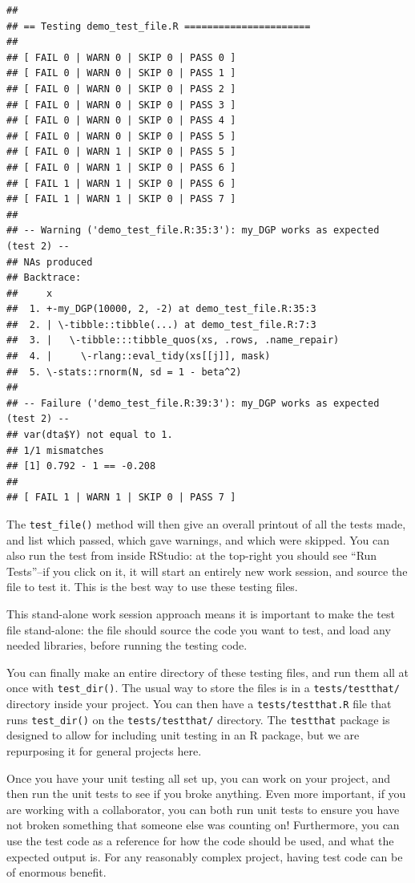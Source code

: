 \documentclass[
]{book}
\begin{document}
\begin{verbatim}
## 
## == Testing demo_test_file.R ======================
## 
## [ FAIL 0 | WARN 0 | SKIP 0 | PASS 0 ]
## [ FAIL 0 | WARN 0 | SKIP 0 | PASS 1 ]
## [ FAIL 0 | WARN 0 | SKIP 0 | PASS 2 ]
## [ FAIL 0 | WARN 0 | SKIP 0 | PASS 3 ]
## [ FAIL 0 | WARN 0 | SKIP 0 | PASS 4 ]
## [ FAIL 0 | WARN 0 | SKIP 0 | PASS 5 ]
## [ FAIL 0 | WARN 1 | SKIP 0 | PASS 5 ]
## [ FAIL 0 | WARN 1 | SKIP 0 | PASS 6 ]
## [ FAIL 1 | WARN 1 | SKIP 0 | PASS 6 ]
## [ FAIL 1 | WARN 1 | SKIP 0 | PASS 7 ]
## 
## -- Warning ('demo_test_file.R:35:3'): my_DGP works as expected (test 2) --
## NAs produced
## Backtrace:
##     x
##  1. +-my_DGP(10000, 2, -2) at demo_test_file.R:35:3
##  2. | \-tibble::tibble(...) at demo_test_file.R:7:3
##  3. |   \-tibble:::tibble_quos(xs, .rows, .name_repair)
##  4. |     \-rlang::eval_tidy(xs[[j]], mask)
##  5. \-stats::rnorm(N, sd = 1 - beta^2)
## 
## -- Failure ('demo_test_file.R:39:3'): my_DGP works as expected (test 2) --
## var(dta$Y) not equal to 1.
## 1/1 mismatches
## [1] 0.792 - 1 == -0.208
## 
## [ FAIL 1 | WARN 1 | SKIP 0 | PASS 7 ]
\end{verbatim}

The \texttt{test\_file()} method will then give an overall printout of all the tests made, and list which passed, which gave warnings, and which were skipped.
You can also run the test from inside RStudio: at the top-right you should see ``Run Tests''--if you click on it, it will start an entirely new work session, and source the file to test it.
This is the best way to use these testing files.

This stand-alone work session approach means it is important to make the test file stand-alone: the file should source the code you want to test, and load any needed libraries, before running the testing code.

You can finally make an entire directory of these testing files, and run them all at once with \texttt{test\_dir()}.
The usual way to store the files is in a \texttt{tests/testthat/} directory inside your project.
You can then have a \texttt{tests/testthat.R} file that runs \texttt{test\_dir()} on the \texttt{tests/testthat/} directory.
The \texttt{testthat} package is designed to allow for including unit testing in an R package, but we are repurposing it for general projects here.

Once you have your unit testing all set up, you can work on your project, and then run the unit tests to see if you broke anything.
Even more important, if you are working with a collaborator, you can both run unit tests to ensure you have not broken something that someone else was counting on!
Furthermore, you can use the test code as a reference for how the code should be used, and what the expected output is.
For any reasonably complex project, having test code can be of enormous benefit.
\end{document}
